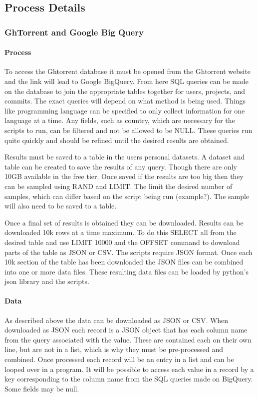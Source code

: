 \documentclass{article}
\begin{document}
\subsection{Process Details}

\subsubsection{GhTorrent and Google Big Query}

\paragraph{Process}
To access the Ghtorrent database it must be opened from the Ghtorrent website and the link will lead to Google BigQuery. From here SQL queries can be made on the database to join the appropriate tables together for users, projects, and commits. The exact queries will depend on what method is being used. Things like programming language can be specified to only collect information for one language at a time. Any fields, such as country, which are necessary for the scripts to run, can be filtered and not be allowed to be NULL. These queries run quite quickly and should be refined until the desired results are obtained.

Results must be saved to a table in the users personal datasets. A dataset and table can be created to save the results of any query. Though there are only 10GB available in the free tier. Once saved if the results are too big then they can be sampled using RAND and LIMIT. The limit the desired number of samples, which can differ based on the script being run (example?). The sample will also need to be saved to a table.

Once a final set of results is obtained they can be downloaded. Results can be downloaded 10k rows at a time maximum. To do this SELECT all from the desired table and use LIMIT 10000 and the OFFSET command to download parts of the table as JSON or CSV. The scripts require JSON format. Once each 10k section of the table has been downloaded the JSON files can be combined into one or more data files. These resulting data files can be loaded by python's json library and the scripts.

\paragraph{Data}
As described above the data can be downloaded as JSON or CSV. When downloaded as JSON each record is a JSON object that has each column name from the query associated with the value. These are contained each on their own line, but are not in a list, which is why they must be pre-processed and combined. Once processed each record will be an entry in a list and can be looped over in a program. It will be possible to access each value in a record by a key corresponding to the column name from the SQL queries made on BigQuery. Some fields may be null.
\end{document}
